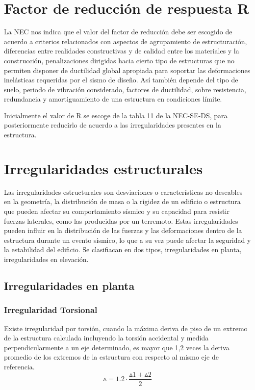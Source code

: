 \documentclass{report}
\begin{document}
\section{Factor de reducci\'on de respuesta R}
La NEC nos indica que el valor del factor de reducci\'on debe ser escogido de acuerdo a criterios relacionados con aspectos de agrupamiento de 
estructuraci\'on, diferencias entre realidades constructivas y de calidad entre los materiales y la construcci\'on, penalizaciones dirigidas hacia cierto tipo de estructuras 
que no permiten 
disponer de ductilidad global apropiada para soportar las deformaciones inel\'asticas requeridas por el sismo de dise\~{n}o. As\'i
tambi\'en depende del tipo de suelo, periodo de vibraci\'on considerado, factores de ductilidad, sobre resistencia, 
redundancia y amortiguamiento de una estructura en condiciones l\'imite.

Inicialmente el valor de R se escoge de la tabla 11 de la NEC-SE-DS, para posteriormente reducirlo de acuerdo a las irregularidades
presentes en la estructura.

\section{Irregularidades estructurales}
Las irregularidades estructurales son desviaciones o caracter\'isticas no deseables en la geometr\'ia, la distribuci\'on 
de masa o la rigidez de un edificio o estructura que pueden afectar su comportamiento s\'ismico y su capacidad para resistir fuerzas laterales, como las producidas por un terremoto. Estas irregularidades pueden influir en la distribuci\'on de las fuerzas y las deformaciones dentro de la estructura 
durante un evento s\'ismico, lo que a su vez puede afectar la seguridad y la estabilidad del edificio. Se clasifiacan en dos tipos,
irregularidades en planta, irregularidades en elevaci\'on.

\subsection{Irregularidades en planta}
\subsubsection{Irregularidad Torsional }
Existe irregularidad por torsi\'on, cuando la m\'axima deriva de piso de un extremo de la estructura calculada incluyendo la torsi\'on accidental y medida perpendicularmente a un eje determinado, es mayor que 1,2 veces la 
deriva promedio de los extremos de la estructura con respecto al mismo eje de referencia.
$$\vartriangle = 1.2 \cdot \dfrac{\vartriangle 1 + \vartriangle 2}{2}$$
\end{document}
